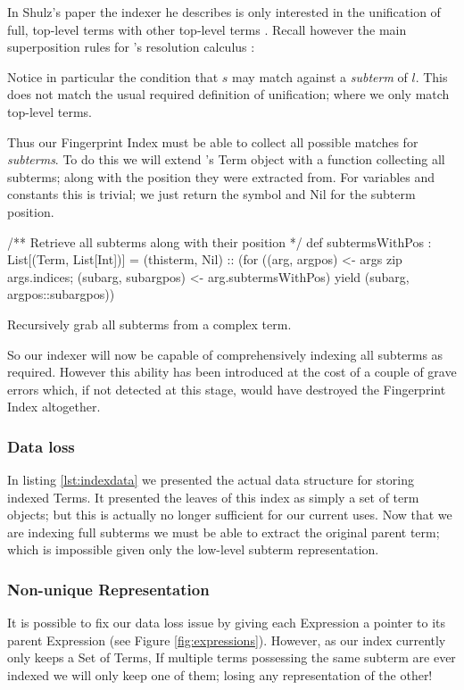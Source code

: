 In Shulz's paper the indexer he describes is only interested in
the unification of full, top-level terms with other top-level terms \cite{shulz12}.
Recall however the main superposition rules for \beagle's resolution calculus \cite{baum13}:

Notice in particular the condition that $s$ may match against a \emph{subterm}
of $l$. This does not match the usual required definition of unification; where
we only match top-level terms.

Thus our Fingerprint Index must be able to collect all possible matches for \emph{subterms}.
To do this we will extend \beagle's Term object with a function collecting all
subterms; along with the position they were extracted from. For variables and constants
this is trivial; we just return the symbol and Nil for the subterm position.

\begin{listing}[H]
\begin{scalacode}
/** Retrieve all subterms along with their position */
def subtermsWithPos : List[(Term, List[Int])] = 
  (thisterm, Nil) :: (for 
    ((arg,    argpos)    <- args zip args.indices;
     (subarg, subargpos) <- arg.subtermsWithPos)
      yield  (subarg, argpos::subargpos))
\end{scalacode}
\caption{Recursively grab all subterms from a complex term.}
\label{lst:subterms}
\end{listing}

So our indexer will now be capable of comprehensively indexing all subterms as required.
However this ability has been introduced at the cost of a couple of grave errors which,
if not detected at this stage, would have destroyed the Fingerprint Index altogether.

\subsubsection{Data loss}
In listing \ref{lst:indexdata} we presented the actual data structure for storing
indexed Terms. It presented the leaves of this index as simply a set of term objects;
but this is actually no longer sufficient for our current uses. Now that we are indexing full subterms
we must be able to extract the original parent term; which is impossible given only
the low-level subterm representation.

\subsubsection{Non-unique Representation}
It is possible to fix our data loss issue by giving each Expression a pointer
to its parent Expression (see Figure \ref{fig:expressions}). However, as our index currently only keeps a Set of Terms,
If multiple terms possessing the same subterm are ever indexed we will only keep
one of them; losing any representation of the other!


